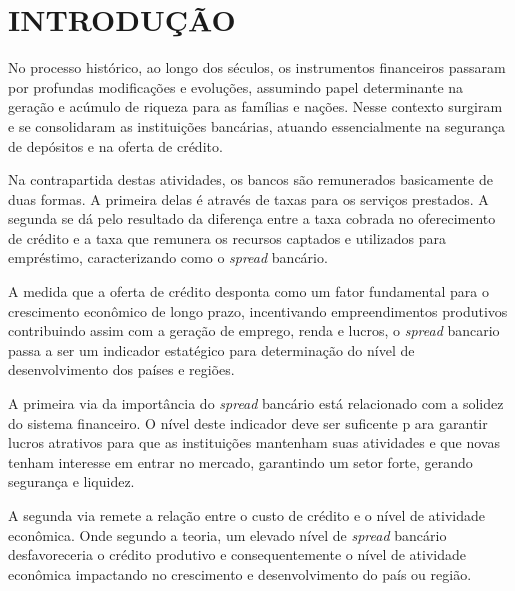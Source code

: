 \documentclass[12pt,openright,oneside,a4paper,chapter=TITLE,section=TITLE,subsection=Title,english,french,spanish,portugues,sumario=tradicional]{04-class-files/abntex2}
\begin{document}




\textual
\pagestyle{simple}

\parindent 1.50cm

\chapter[introducao]{INTRODUÇÃO}

No processo histórico, ao longo dos séculos, os instrumentos financeiros
passaram por profundas modificações e evoluções, assumindo papel determinante na
geração e acúmulo de riqueza para as famílias e nações. Nesse contexto surgiram
e se consolidaram as instituições bancárias, atuando essencialmente na segurança de depósitos e na oferta de crédito.

Na contrapartida destas atividades, os bancos são remunerados basicamente de
duas formas. A primeira delas é através de taxas para os serviços prestados. A
segunda se dá pelo resultado da diferença entre a taxa cobrada no oferecimento
de crédito e a taxa que remunera os recursos captados e utilizados para
empréstimo, caracterizando como o \emph{spread} bancário.

A medida que a oferta de crédito desponta como um fator fundamental para o
crescimento econômico de longo prazo, incentivando empreendimentos produtivos
contribuindo assim com a geração de emprego, renda e lucros, o \emph{spread} bancario
passa a ser um indicador estatégico para determinação do nível de desenvolvimento dos países e regiões.

A primeira via da importância do \emph{spread} bancário está relacionado com a
solidez do sistema financeiro. O nível deste indicador deve ser suficente p
ara garantir lucros atrativos para que as instituições mantenham suas atividades
e que novas tenham interesse em entrar no mercado, garantindo um setor forte,
gerando segurança e liquidez.

A segunda via remete a relação entre o custo de crédito e o nível de atividade
econômica. Onde segundo a teoria, um elevado nível de \emph{spread} bancário
desfavoreceria o crédito produtivo e consequentemente o nível de atividade
econômica impactando no crescimento e desenvolvimento do país ou região.
\end{document}
